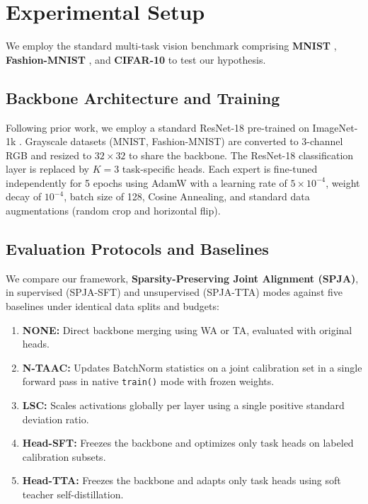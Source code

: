\documentclass{article}
\theoremstyle{plain}
\theoremstyle{definition}
\theoremstyle{remark}
\begin{document}
\section{Experimental Setup}
We employ the standard multi-task vision benchmark comprising \textbf{MNIST} \cite{lecun1998gradient}, \textbf{Fashion-MNIST} \cite{xiao2017fashion}, and \textbf{CIFAR-10} \cite{krizhevsky2009learning} to test our hypothesis.

\subsection{Backbone Architecture and Training}
Following prior work, we employ a standard ResNet-18 \cite{he2016deep} pre-trained on ImageNet-1k \cite{deng2009imagenet}. Grayscale datasets (MNIST, Fashion-MNIST) are converted to 3-channel RGB and resized to $32 \times 32$ to share the backbone. The ResNet-18 classification layer is replaced by $K=3$ task-specific heads. Each expert is fine-tuned independently for 5 epochs using AdamW \cite{loshchilov2017decoupled} with a learning rate of $5\times 10^{-4}$, weight decay of $10^{-4}$, batch size of 128, Cosine Annealing, and standard data augmentations (random crop and horizontal flip).

\subsection{Evaluation Protocols and Baselines}
We compare our framework, \textbf{Sparsity-Preserving Joint Alignment (SPJA)}, in supervised (SPJA-SFT) and unsupervised (SPJA-TTA) modes against five baselines under identical data splits and budgets:
\begin{enumerate}
    \item \textbf{NONE:} Direct backbone merging using WA or TA, evaluated with original heads.
    \item \textbf{N-TAAC:} Updates BatchNorm statistics on a joint calibration set in a single forward pass in native \texttt{train()} mode with frozen weights.
    \item \textbf{LSC:} Scales activations globally per layer using a single positive standard deviation ratio.
    \item \textbf{Head-SFT:} Freezes the backbone and optimizes only task heads on labeled calibration subsets.
    \item \textbf{Head-TTA:} Freezes the backbone and adapts only task heads using soft teacher self-distillation.
\end{enumerate}
\end{document}
